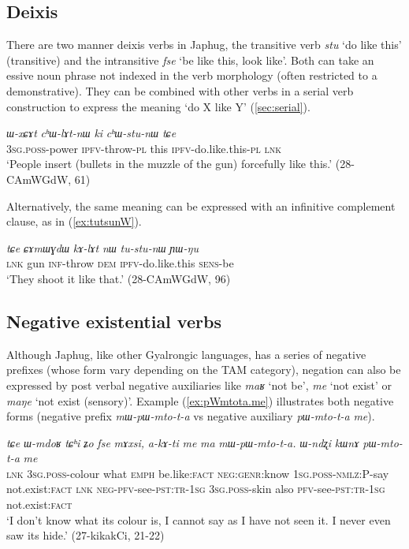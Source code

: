 \documentclass[oneside,a4paper,11pt]{article}
\newcommand{\ipa}[1]{\textit{\phon#1}}
\newcommand{\jpg}[2]{\ipa{#1} `#2'}
\newcommand{\refb}[1]{(\ref{#1})}
\begin{document}
  \subsection{Deixis} \label{sec:deixis}
 There are two manner deixis verbs in Japhug, the transitive verb \jpg{stu}{do like this} (transitive) and the intransitive \jpg{fse}{be like this, look like}. Both can take an essive noun phrase not indexed in the verb morphology (often restricted to a demonstrative). They can be combined with other verbs in a serial verb construction to express the meaning `do X like Y' (\ref{sec:serial}).
 
 \begin{exe}
\ex \label{ex:chWtsunW}
\gll \ipa{ɯ-xɕɤt} 	\ipa{cʰɯ-lɤt-nɯ} 	\ipa{ki} 	\ipa{cʰɯ-stu-nɯ} 	\ipa{tɕe} \\
\textsc{3sg.poss}-power \textsc{ipfv}-throw-\textsc{pl} this  \textsc{ipfv}-do.like.this-\textsc{pl} \textsc{lnk} \\
\glt `People insert (bullets in the muzzle of the gun) forcefully like this.' (28-CAmWGdW, 61)
\end{exe}

 Alternatively, the same meaning can be expressed with an infinitive complement clause, as in \refb{ex:tutsunW}.
 
 \begin{exe}
\ex \label{ex:tutsunW}
\gll \ipa{tɕe} 	\ipa{ɕɤmɯɣdɯ} 	\ipa{kɤ-lɤt} 	\ipa{nɯ} 	\ipa{tu-stu-nɯ} 	\ipa{ɲɯ-ŋu}  \\
\textsc{lnk} gun \textsc{inf}-throw \textsc{dem} \textsc{ipfv}-do.like.this \textsc{sens}-be \\
\glt `They shoot it like that.' (28-CAmWGdW, 96)
\end{exe}

\subsection{Negative existential verbs} \label{sec:neg}
Although Japhug, like other Gyalrongic languages, has a series of negative prefixes (whose form vary depending on the TAM category), negation can also be expressed by post verbal negative auxiliaries like \jpg{maʁ}{not be}, \jpg{me}{not exist} or \jpg{maŋe}{not exist (sensory)}. Example \refb{ex:pWmtota.me} illustrates both negative forms (negative prefix \ipa{mɯ-pɯ-mto-t-a} vs negative auxiliary \ipa{pɯ-mto-t-a}  \ipa{me}).

\begin{exe}
\ex \label{ex:pWmtota.me}
\gll  
\ipa{tɕe} 	\ipa{ɯ-mdoʁ} 	\ipa{tɕʰi} 	\ipa{ʑo} 	\ipa{fse} 	\ipa{mɤxsi,} 	\ipa{a-kɤ-ti} 	\ipa{me} 	\ipa{ma} 	\ipa{mɯ-pɯ-mto-t-a.} \ipa{ɯ-ndʐi} 	\ipa{kɯnɤ} 	\ipa{pɯ-mto-t-a} 	\ipa{me}  \\
\textsc{lnk} \textsc{3sg.poss}-colour what \textsc{emph} be.like:\textsc{fact} \textsc{neg:genr}:know \textsc{1sg.poss-nmlz:P}-say not.exist:\textsc{fact} \textsc{lnk} \textsc{neg-pfv}-see-\textsc{pst:tr-1sg}  \textsc{3sg.poss}-skin also  \textsc{pfv}-see-\textsc{pst:tr-1sg} not.exist:\textsc{fact} \\
\glt `I don't know what its colour is, I cannot say as I have not seen it. I never even saw its hide.'  (27-kikakCi, 21-22)
\end{exe}
\end{document}

